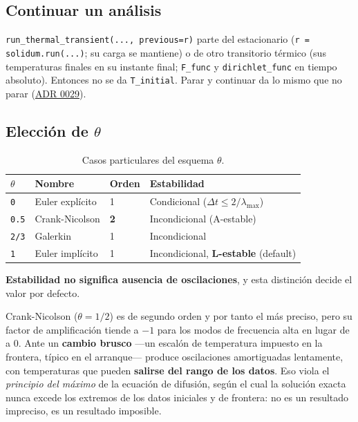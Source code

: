 \documentclass[11pt,oneside]{report}
\begin{document}
\subsection{Continuar un análisis}

\texttt{run\_\allowbreak{}thermal\_\allowbreak{}transient(.\allowbreak{}.\allowbreak{}.\allowbreak{}, previous=r)} parte del estacionario (\texttt{r = solidum.\allowbreak{}run(.\allowbreak{}.\allowbreak{}.\allowbreak{})}; su carga se mantiene) o de otro transitorio térmico (sus temperaturas finales en su instante final; \texttt{F\_func} y \texttt{dirichlet\_func} en tiempo absoluto). Entonces no se da \texttt{T\_initial}. Parar y continuar da lo mismo que no parar (\href{https://github.com/jretamav/solidum-fem/blob/main/docs/adr/0029-continuidad-de-los-analisis-en-el-tiempo.md}{ADR 0029}).

\subsection{Elección de $\theta$}

\begin{table}[h]
\centering
\caption{Casos particulares del esquema $\theta$.}
\begin{tabularx}{\textwidth}{YYYY}
\hline
\textbf{$\theta$} & \textbf{Nombre} & \textbf{Orden} & \textbf{Estabilidad} \\
\hline
\texttt{0} & Euler explícito & 1 & Condicional ($\Delta t \le 2/\lambda_{\max}$) \\
\texttt{0.5} & Crank-Nicolson & \textbf{2} & Incondicional (A-estable) \\
\texttt{2/3} & Galerkin & 1 & Incondicional \\
\texttt{1} & Euler implícito & 1 & Incondicional, \textbf{L-estable} (default) \\
\hline
\end{tabularx}
\end{table}
\textbf{Estabilidad no significa ausencia de oscilaciones}, y esta distinción decide el valor por defecto.

Crank-Nicolson ($\theta = 1/2$) es de segundo orden y por tanto el más preciso, pero su factor de amplificación tiende a $-1$ para los modos de frecuencia alta en lugar de a $0$. Ante un \textbf{cambio brusco} ---un escalón de temperatura impuesto en la frontera, típico en el arranque--- produce oscilaciones amortiguadas lentamente, con temperaturas que pueden \textbf{salirse del rango de los datos}. Eso viola el \textit{principio del máximo} de la ecuación de difusión, según el cual la solución exacta nunca excede los extremos de los datos iniciales y de frontera: no es un resultado impreciso, es un resultado imposible.
\end{document}
